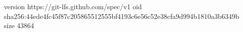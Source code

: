 version https://git-lfs.github.com/spec/v1
oid sha256:44ede4fc45f87c205865512555bf4193c6e56c52e38cfa9d994b1810a3b6349b
size 43864
